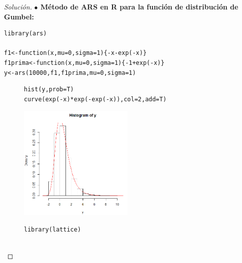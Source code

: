\documentclass[11pt]{article}
\renewcommand{\=}[1]{\stackrel{#1}{=}} %
\newenvironment{sol}
{\begin{proof}[Solución]}
	{\end{proof}}
\theoremstyle{definition}
\theoremstyle{remark}
\begin{document}
\begin{itemize}
\begin{sol}
{\bf $\bullet$ Método de ARS en R para la función de distribución de Gumbel:}

{
	\begin{lstlisting}[style=myRstyle, caption={Algoritmo ARS / GUMBEL.}]
library(ars)

f1<-function(x,mu=0,sigma=1){-x-exp(-x)}
f1prima<-function(x,mu=0,sigma=1){-1+exp(-x)}
y<-ars(10000,f1,f1prima,mu=0,sigma=1)
	\end{lstlisting}
}			
	\begin{figure}[h]
	\hspace*{0.9cm}\begin{minipage}{10cm}
		{
			\begin{lstlisting}[style=myRstyle, caption={Verificación mediante histograma / GUMBEL.}]
hist(y,prob=T)
curve(exp(-x)*exp(-exp(-x)),col=2,add=T)
			\end{lstlisting}
		}			
	\end{minipage}
	\begin{minipage}{6cm}
		\includegraphics[width=5.5cm]{hist4}
	\end{minipage}
\end{figure}
	\begin{figure}[h]
	\hspace*{0.9cm}\begin{minipage}{10cm}
		{
			\begin{lstlisting}[style=myRstyle, caption={Verificación mediante gráfica de cuantiles / GUMBEL.}]
library(lattice)


\end{lstlisting}}
\end{minipage}
\end{figure}
\end{sol}
\end{itemize}
\end{document}
